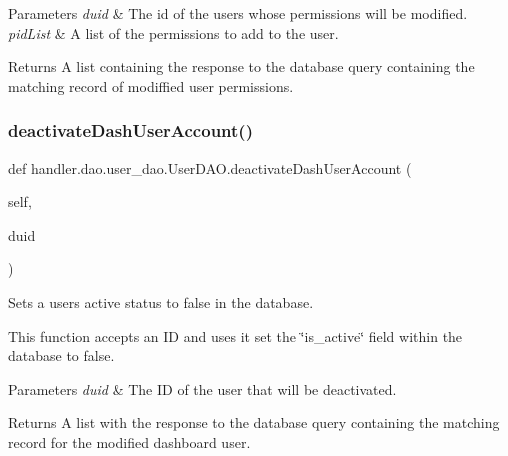 \begin{DoxyParams}{Parameters}
{\em duid} & The id of the user\textquotesingle{}s whose permissions will be modified. \\
\hline
{\em pid\+List} & A list of the permissions to add to the user.\\
\hline
\end{DoxyParams}
\begin{DoxyReturn}{Returns}
A list containing the response to the database query containing the matching record of modiffied user permissions. 
\end{DoxyReturn}
\mbox{\label{classhandler_1_1dao_1_1user__dao_1_1_user_d_a_o_af9e5fda379f239935a78b40c95eee115}} 
\subsubsection{\texorpdfstring{deactivate\+Dash\+User\+Account()}{deactivateDashUserAccount()}}
{\footnotesize\ttfamily def handler.\+dao.\+user\+\_\+dao.\+User\+D\+A\+O.\+deactivate\+Dash\+User\+Account (\begin{DoxyParamCaption}\item[{}]{self,  }\item[{}]{duid }\end{DoxyParamCaption})}



Sets a user\textquotesingle{}s active status to false in the database. 

This function accepts an ID and uses it set the \char`\"{}is\+\_\+active\char`\"{} field within the database to false.


\begin{DoxyParams}{Parameters}
{\em duid} & The ID of the user that will be deactivated.\\
\hline
\end{DoxyParams}
\begin{DoxyReturn}{Returns}
A list with the response to the database query containing the matching record for the modified dashboard user. 
\end{DoxyReturn}
\mbox{\label{classhandler_1_1dao_1_1user__dao_1_1_user_d_a_o_a25d86e662021b773fd0b49299079f443}} 
